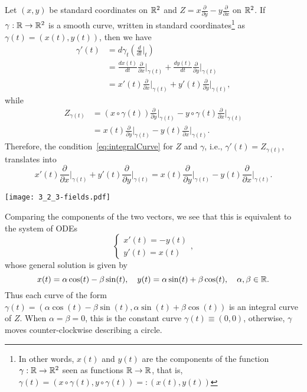 \begin{example}\label{ex:rotation}
  Let $(x,y)$ be standard coordinates on $\mathbb{R}^2$ and $Z = x\frac{\partial}{\partial y} - y\frac{\partial}{\partial x}$ on $\mathbb{R}^2$.
  If $\gamma:\mathbb{R}\to\mathbb{R}^2$ is a smooth curve, written in standard coordinates\footnote{In other words, $x(t)$ and $y(t)$ are the components of the function $\gamma : \mathbb{R} \to \mathbb{R}^2$ seen as functions $\mathbb{R}\to\mathbb{R}$, that is, ${\gamma(t) = (x\circ \gamma(t), y\circ \gamma(t)) =: (x(t), y(t))}$} as $\gamma(t) = (x(t), y(t))$, then we have
  \begin{align}
    \gamma'(t)
    &= d\gamma_t\left(\frac{d}{dt}\Big|_t\right) \\
    &= \frac{d x(t)}{d t} \frac{\partial}{\partial x}\Big|_{\gamma(t)} + \frac{d y(t)}{d t} \frac{\partial}{\partial y}\Big|_{\gamma(t)} \\
    &= x'(t)\frac{\partial}{\partial x}\Big|_{\gamma(t)} + y'(t)\frac{\partial}{\partial y}\Big|_{\gamma(t)},
  \end{align}
  while
  \begin{align}
    Z_{\gamma(t)}
    &= (x\circ \gamma(t))\frac{\partial}{\partial y}\Big|_{\gamma(t)} - y \circ \gamma(t)\frac{\partial}{\partial x}\Big|_{\gamma(t)} \\
    &= x(t)\frac{\partial}{\partial y}\Big|_{\gamma(t)} - y(t)\frac{\partial}{\partial x}\Big|_{\gamma(t)}.
  \end{align}
  Therefore, the condition~\eqref{eq:integralCurve} for $Z$ and $\gamma$, i.e., $\gamma'(t) = Z_{\gamma(t)}$, translates into
  \begin{equation}
    x'(t)\frac{\partial}{\partial x}\Big|_{\gamma(t)} + y'(t)\frac{\partial}{\partial y}\Big|_{\gamma(t)} = x(t)\frac{\partial}{\partial y}\Big|_{\gamma(t)} - y(t)\frac{\partial}{\partial x}\Big|_{\gamma(t)}.
  \end{equation}
  \begin{marginfigure}
    \texttt{[image: 3\_2\_3-fields.pdf]}
  \end{marginfigure}
  \noindent Comparing the components of the two vectors, we see that this is equivalent to the system of ODEs
  \begin{equation}
    \begin{cases}
      x'(t) = - y(t)\\
      y'(t) = x(t)
    \end{cases},
  \end{equation}
  whose general solution is given by
  \begin{equation}
    x(t) = \alpha\cos(t) - \beta\sin(t), \quad
    y(t) = \alpha\sin(t) + \beta\cos(t), \quad \alpha,\beta\in\mathbb{R}.
  \end{equation}
  Thus each curve of the form $\gamma(t) = (\alpha\cos(t) -  \beta\sin(t), \alpha\sin(t) + \beta\cos(t))$ is an integral curve of $Z$.
  When $\alpha=\beta=0$, this is the constant curve $\gamma(t)\equiv (0,0)$, otherwise, $\gamma$ moves counter-clockwise describing a circle.
\end{example}

